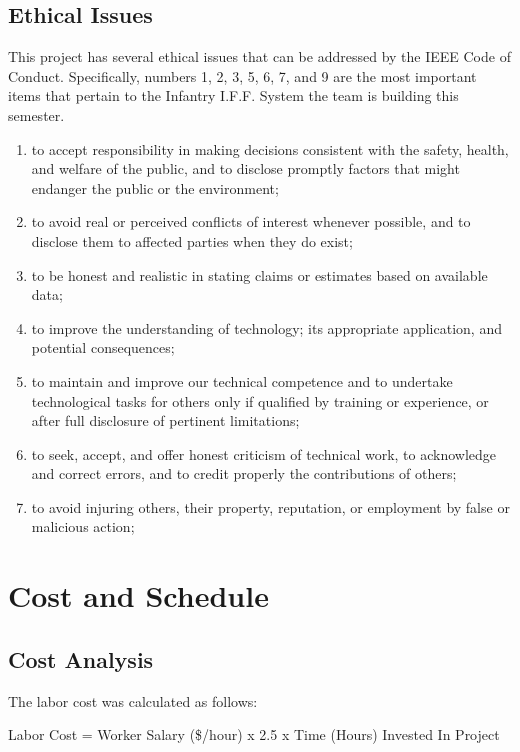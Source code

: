 \documentclass[letterpaper,10pt]{article}
\makeatletter
\newcommand{\skipitems}[1]{%
	\addtocounter{\@enumctr}{#1}%
}
\makeatother
\begin{document}
\begin{spacing}{1.15}
\subsection{Ethical Issues}
This project has several ethical issues that can be addressed by the IEEE Code of Conduct. Specifically, numbers 1, 2, 3, 5, 6, 7, and 9 are the most important items that pertain to the Infantry I.F.F. System the team is building this semester. 
\begin{enumerate}
\item to accept responsibility in making decisions consistent with the safety, health, and welfare of the public, and to disclose promptly factors that might endanger the public or the environment;
\item to avoid real or perceived conflicts of interest whenever possible, and to disclose them to affected parties when they do exist;
\item to be honest and realistic in stating claims or estimates based on available data;  
\skipitems{1}
\item to improve the understanding of technology; its appropriate application, and potential consequences;  
\item to maintain and improve our technical competence and to undertake technological tasks for others only if qualified by training or experience, or after full disclosure of pertinent limitations;  
\item to seek, accept, and offer honest criticism of technical work, to acknowledge and correct errors, and to credit properly the contributions of others;  
\skipitems{1}
\item to avoid injuring others, their property, reputation, or employment by false or malicious action;  
\end{enumerate}

\section{Cost and Schedule}

\subsection{Cost Analysis}
The labor cost was calculated as follows:

\begin{center}
	Labor Cost = Worker Salary (\$/hour) x 2.5 x Time (Hours) Invested In Project
\end{center}


\end{spacing}
\end{document}

